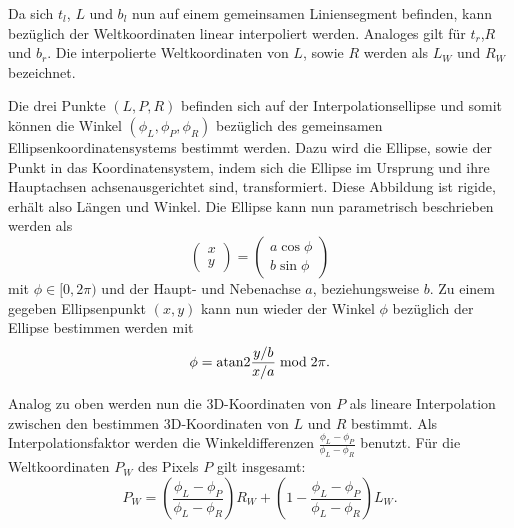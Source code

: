 Da sich $t_l$, $L$ und $b_l$ nun auf einem gemeinsamen Liniensegment befinden, kann bezüglich der Weltkoordinaten linear interpoliert werden. Analoges gilt für $t_r$,$R$ und $b_r$.
Die interpolierte Weltkoordinaten von $L$, sowie $R$ werden als $L_W$ und $R_W$ bezeichnet.

Die drei Punkte $(L, P, R)$ befinden sich auf der Interpolationsellipse und somit können die  Winkel $(\phi_L, \phi_P, \phi_R)$ bezüglich des gemeinsamen Ellipsenkoordinatensystems bestimmt werden. Dazu wird die Ellipse, sowie der Punkt in das Koordinatensystem, indem sich die Ellipse im Ursprung und ihre Hauptachsen achsenausgerichtet sind, transformiert. Diese Abbildung ist rigide, erhält also Längen und Winkel. Die Ellipse kann nun parametrisch beschrieben werden als
\[
\begin{pmatrix}x \\ y\end{pmatrix} = \begin{pmatrix}a\cos\phi \\
b\sin\phi\end{pmatrix}
\] %
mit $\phi \in [0, 2\pi)$ und der Haupt- und Nebenachse $a$, beziehungsweise $b$. Zu einem gegeben Ellipsenpunkt $(x,y)$ kann nun wieder der Winkel $\phi$ bezüglich der Ellipse bestimmen werden mit
\[
\phi = \text{atan2} \frac{y/b}{x/a} \bmod 2\pi.
\] %

Analog zu oben werden nun die 3D-Koordinaten von $P$ als lineare Interpolation zwischen den bestimmen 3D-Koordinaten von $L$ und $R$ bestimmt. Als Interpolationsfaktor werden die Winkeldifferenzen
$\frac{\phi_L - \phi_P}{\phi_L - \phi_R}$ benutzt. Für die Weltkoordinaten $P_W$ des Pixels $P$ gilt insgesamt:
\[
P_W = \left(\frac{\phi_L - \phi_P}{\phi_L - \phi_R}\right) R_W + \left(1 - \frac{\phi_L - \phi_P}{\phi_L - \phi_R}\right) L_W.
\]

